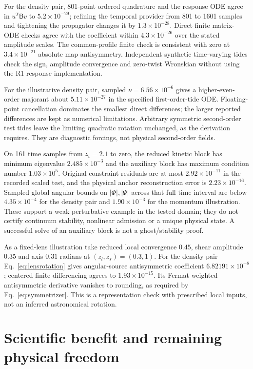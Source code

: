\documentclass[11pt,a4paper]{article}
\begin{document}
For the density pair, 801-point ordered quadrature and the response ODE
agree in $u^T\mathsf Bv$ to $5.2\times10^{-29}$; refining the temporal
provider from 801 to 1601 samples and tightening the propagator changes
it by $1.3\times10^{-28}$. Direct finite matrix-ODE checks agree with
the coefficient within $4.3\times10^{-26}$ over the stated amplitude
scales. The common-profile finite check is consistent with zero at
$3.4\times10^{-21}$ absolute map antisymmetry. Independent synthetic
time-varying tides check the sign, amplitude convergence and zero-twist
Wronskian without using the R1 response implementation.

For the illustrative density pair, sampled $\nu=6.56\times10^{-6}$
gives a higher-even-order majorant about $5.11\times10^{-27}$ in the
specified first-order-tide ODE. Floating-point cancellation dominates
the smallest direct differences; the larger reported differences are
kept as numerical limitations. Arbitrary symmetric second-order test
tides leave the limiting quadratic rotation unchanged, as the derivation
requires. They are diagnostic forcings, not physical second-order fields.

On 161 time samples from $z_i=2.1$ to zero, the reduced kinetic block
has minimum eigenvalue $2.485\times10^{-3}$ and the auxiliary block has
maximum condition number $1.03\times10^5$. Original constraint residuals
are at most $2.92\times10^{-11}$ in the recorded scaled test, and the
physical anchor reconstruction error is $2.23\times10^{-16}$. Sampled
global angular bounds on $|\Phi|,|\Psi|$ across that full time interval
are below $4.35\times10^{-4}$ for the density pair and $1.90\times10^{-3}$
for the momentum illustration. These support a weak perturbative example
in the tested domain; they do not certify continuum stability, nonlinear
admission or a unique physical state. A successful solve of an auxiliary
block is not a ghost/stability proof.

As a fixed-lens illustration take reduced local convergence $0.45$,
shear amplitude $0.35$ and axis $0.31$ radians at $(z_l,z_s)=(0.3,1)$.
For the density pair Eq.~\eqref{eq:lensrotation} gives angular-source
antisymmetric coefficient $6.82191\times10^{-8}$; centered finite
differencing agrees to $1.93\times10^{-15}$. Its Fermat-weighted
antisymmetric derivative vanishes to rounding, as required by
Eq.~\eqref{eq:symmetrizer}. This is a representation check with
prescribed local inputs, not an inferred astronomical rotation.

\section{Scientific benefit and remaining physical freedom}
\end{document}

